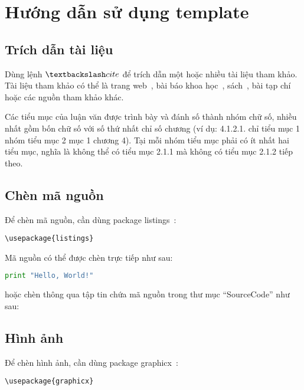 \chapter{Hướng dẫn sử dụng template}
\label{Chapter3}

\section{Trích dẫn tài liệu}

Dùng lệnh $\textbackslash cite$ để trích dẫn một hoặc nhiều tài liệu tham khảo. Tài liệu tham khảo có thể là trang web~\cite{Listings,HDLVThS}, bài báo khoa học~\cite{1994-Cavnar}, sách~\cite{1984-TeX-Knuth,2006-DDien,2006-NPTV}, bài tạp chí~\cite{1989-TED} hoặc các nguồn tham khảo khác. 

Các tiểu mục của luận văn được trình bày và đánh số thành nhóm chữ số, nhiều nhất gồm bốn chữ số với số thứ nhất chỉ số chương (ví dụ: 4.1.2.1. chỉ tiểu mục 1 nhóm tiểu mục 2 mục 1 chương 4).
Tại mỗi nhóm tiểu mục phải có ít nhất hai tiểu mục, nghĩa là không thể có tiểu mục 2.1.1 mà không có tiểu mục 2.1.2 tiếp theo.

\section{Chèn mã nguồn}

Để chèn mã nguồn, cần dùng package listings~\cite{Listings}:

\begin{lstlisting}
\usepackage{listings}
\end{lstlisting}

Mã nguồn có thể được chèn trực tiếp như sau:

\begin{lstlisting}[language=Python]
print "Hello, World!"
\end{lstlisting}

hoặc chèn thông qua tập tin chứa mã nguồn trong thư mục ``SourceCode'' như sau:



\section{Hình ảnh}

Để chèn hình ảnh, cần dùng package graphicx~\cite{Figures}:

\begin{lstlisting}
\usepackage{graphicx}
\end{lstlisting}

